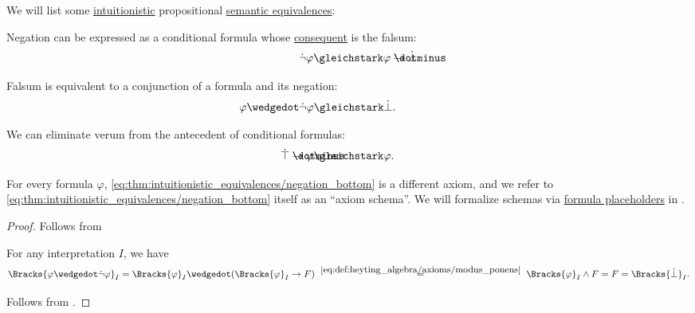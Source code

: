 \begin{proposition}\label{thm:intuitionistic_equivalences}
  We will list some \hyperref[def:propositional_semantics]{intuitionistic} propositional \hyperref[def:semantic_equivalence]{semantic equivalences}:
  \begin{thmenum}
     Negation can be expressed as a conditional formula whose \hyperref[def:conditional_formula/consequent]{consequent} is the falsum:
    \begin{equation}\label{eq:thm:intuitionistic_equivalences/negation_bottom}
      \mathllap{\synneg \varphi} \gleichstark \mathrlap{\varphi \synimplies \synbot.}
    \end{equation}

     Falsum is equivalent to a conjunction of a formula and its negation:
    \begin{equation}\label{eq:thm:intuitionistic_equivalences/contradiction}
      \mathllap{\varphi \synwedge \synneg \varphi} \gleichstark \mathrlap{\synbot.}
    \end{equation}

     We can eliminate verum from the antecedent of conditional formulas:
    \begin{equation}\label{eq:thm:intuitionistic_equivalences/top_elim}
      \mathllap{\syntop \synimplies \varphi} \gleichstark \mathrlap{\varphi.}
    \end{equation}
  \end{thmenum}
\end{proposition}
\begin{comments}
  \item For every formula \( \varphi \), \eqref{eq:thm:intuitionistic_equivalences/negation_bottom} is a different axiom, and we refer to \eqref{eq:thm:intuitionistic_equivalences/negation_bottom} itself as an \enquote{axiom schema}. We will formalize schemas via \hyperref[def:propositional_formula_placeholder]{formula placeholders} in .
\end{comments}
\begin{proof}
   Follows from 

   For any interpretation \( I \), we have
  \begin{equation*}
    \Bracks{ \varphi \synwedge \synneg \varphi }_I
    =
    \Bracks{ \varphi }_I \synwedge (\Bracks{ \varphi }_I \rightarrow F)
    \reloset {\eqref{eq:def:heyting_algebra/axioms/modus_ponens}} =
    \Bracks{ \varphi }_I \wedge F
    =
    F
    =
    \Bracks{\synbot}_I.
  \end{equation*}

   Follows from .
\end{proof}

